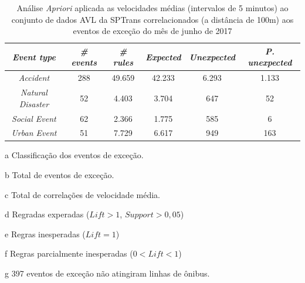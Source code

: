 \documentclass[
	12pt,				%
	oneside,			%
	a4paper,			%
	english,			%
	brazil				%
	]{abntex2ppgsi}
\begin{document}
\begin{apendicesenv}
\begin{table}[!htb]
\centering
\begin{threeparttable}
\caption {Análise \textit{Apriori} aplicada as velocidades médias (intervalos de 5 minutos) ao conjunto de dados AVL da SPTrans correlacionados (a distância de 100m) aos eventos de exceção do mês de junho de 2017}
\label {tab:aprioriFull}
\begin{tabular}{c|c|c|c|c|c}
\hline
\textbf{\textit{Event type}}\tnote{a} & \textbf{\textit{\# events}}\tnote{b} & \textit{\textbf{\# rules}}\tnote{c} & \textbf{\textit{Expected}}\tnote{d} & \textbf{\textit{Unexpected}}\tnote{e} & \textbf{\textit{P. unexpected}}\tnote{f}   \\
\hline
\textit{Accident} & 288 & 49.659 & 42.233 & 6.293 & 1.133 \\
\textit{Natural Disaster} & 52 & 4.403 & 3.704 & 647 & 52 \\
\textit{Social Event} & 62 & 2.366 & 1.775 & 585 & 6 \\
\textit{Urban Event} & 51 & 7.729 & 6.617 & 949 & 163 \\
\hline
\end{tabular}
\begin{tablenotes}
            \item[a] Classificação dos eventos de exceção.
            \item[b] Total de eventos de exceção.
            \item[c] Total de correlações de velocidade média.
            \item[d] Regradas experadas ($Lift > 1$, $Support > 0,05$)
            \item[e] Regras inesperadas ($Lift = 1$)
            \item[f] Regras parcialmente inesperadas ($0 < Lift < 1$)
            \item[g] 397 eventos de exceção não atingiram linhas de ônibus.
        \end{tablenotes}
\end{threeparttable}
\end{table}



\end{apendicesenv}
\end{document}

